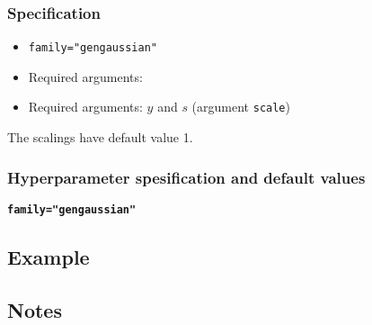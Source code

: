 \documentclass[a4paper,11pt]{article}
\begin{document}
\subsubsection*{Specification}
\begin{itemize}
\item \texttt{family="gengaussian"}
\item Required arguments:
\item Required arguments: $y$ and $s$ (argument \texttt{scale})
\end{itemize}
The scalings have default value 1.

\subsubsection*{Hyperparameter spesification and default values}
\textbf{\texttt{family="gengaussian"}}


\subsection*{Example}



\subsection*{Notes}
\end{document}
